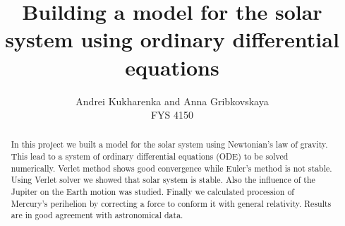 \documentclass[10pt]{article}
\begin{document}
\setlength\parindent{1pt}
\title{Building a model for the solar system using ordinary differential equations}
\author{Andrei Kukharenka and Anna Gribkovskaya \\  
FYS 4150 
}

\maketitle
\begin{abstract}
In this project we built a model for the solar system using Newtonian's law of gravity. This lead to a system of ordinary differential equations (ODE) to be solved numerically. Verlet method shows good convergence while Euler's method is not stable. Using Verlet solver we showed that solar system is stable. Also the influence of the Jupiter on the Earth motion was studied. Finally we calculated procession of Mercury's perihelion by correcting a force to conform it with general relativity. Results are in good agreement with astronomical data. 
\end{abstract}
\clearpage 
\end{document}
